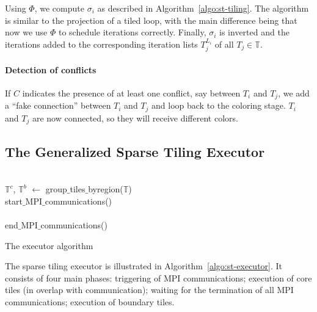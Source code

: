 Using $\Phi$, we compute $\sigma_i$ as described in Algorithm~\ref{algo:st-tiling}. The algorithm is similar to the projection of a tiled loop, with the main difference being that now we use $\Phi$ to schedule iterations correctly. Finally, $\sigma_i$ is inverted and the iterations added to the corresponding iteration lists $T_j^{L_i}$ of all $T_j \in \mathbb{T}$. 


\paragraph{Detection of conflicts}
If $C$ indicates the presence of at least one conflict, say between $T_i$ and $T_j$, we add a ``fake connection'' between $T_i$ and $T_j$ and loop back to the coloring stage. $T_i$ and $T_j$ are now connected, so they will receive different colors. 



\subsection{The Generalized Sparse Tiling Executor}

\begin{algorithm}[t]
\nonl ~\\
$\mathbb{T}^{c}$, $\mathbb{T}^{b}$ $\gets$ group$\_$tiles$\_$byregion($\mathbb{T}$)\;
\nonl ~\\
start$\_$MPI$\_$communications()\;
\nonl ~\\
\nonl ~\\
end$\_$MPI$\_$communications()\;
\nonl ~\\
\caption{The executor algorithm}
\label{algo:st-executor}
\end{algorithm}


The sparse tiling executor is illustrated in Algorithm~\ref{algo:st-executor}. It consists of four main phases: triggering of MPI communications; execution of core tiles (in overlap with communication); waiting for the termination of all MPI communications; execution of boundary tiles.


